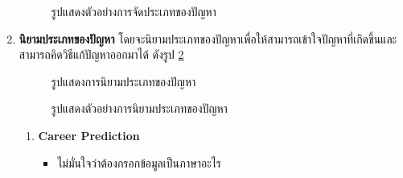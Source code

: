 \begin{enumerate}
\begin{figure}[H]
              \caption{รูปแสดงตัวอย่างการจัดประเภทของปัญหา}\label{fig:exam-Groping}
          \end{figure}
    \item \textbf{นิยามประเภทของปัญหา} โดยจะนิยามประเภทของปัญหาเพื่อให้สามารถเข้าใจปัญหาที่เกิดขึ้นและสามารถคิดวิธีแก้ปัญหาออกมาได้ ดังรูป \ref{fig:CreateTheme}
          \begin{figure}[H]\centering
              \caption{รูปแสดงการนิยามประเภทของปัญหา}\label{fig:CreateTheme}
          \end{figure}
          \begin{figure}[H]\centering
              \caption{รูปแสดงตัวอย่างการนิยามประเภทของปัญหา}\label{fig:exam-CreateTheme}
          \end{figure}
          \begin{enumerate}
              \item \textbf{Career Prediction}
                    \begin{itemize}
                        \item ไม่มั่นใจว่าต้องกรอกข้อมูลเป็นภาษาอะไร

\end{itemize}
\end{enumerate}
\end{enumerate}
